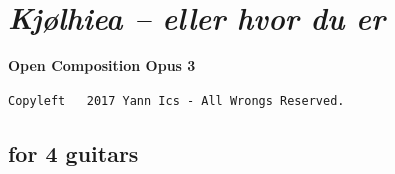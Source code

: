 \newpage

{}
\thispagestyle{empty}

\section*{\textsl{Kjølhiea -- eller hvor du er}}
\label{kjcc}

\begin{center} 
\textbf{Open Composition Opus 3}

{\scriptsize  \texttt{Copyleft \textcopyleft \, 2017 Yann Ics - All Wrongs Reserved.}}
 \end{center} 
 
\subsection*{\quad for 4 guitars}
\label{kjccqg}
\label{kj}

\vspace{-5mm}

